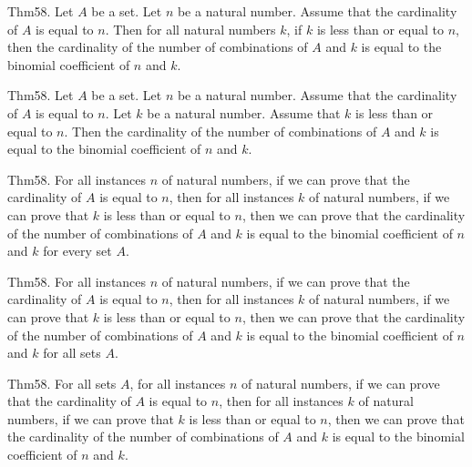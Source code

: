 \documentclass{article}
\begin{document}
Thm58. Let $A$ be a set. Let $n$ be a natural number. Assume that the cardinality of $A$ is equal to $n$. Then for all natural numbers $k$, if $k$ is less than or equal to $n$, then the cardinality of the number of combinations of $A$ and $k$ is equal to the binomial coefficient of $n$ and $k$.

Thm58. Let $A$ be a set. Let $n$ be a natural number. Assume that the cardinality of $A$ is equal to $n$. Let $k$ be a natural number. Assume that $k$ is less than or equal to $n$. Then the cardinality of the number of combinations of $A$ and $k$ is equal to the binomial coefficient of $n$ and $k$.

Thm58. For all instances $n$ of natural numbers, if we can prove that the cardinality of $A$ is equal to $n$, then for all instances $k$ of natural numbers, if we can prove that $k$ is less than or equal to $n$, then we can prove that the cardinality of the number of combinations of $A$ and $k$ is equal to the binomial coefficient of $n$ and $k$ for every set $A$.

Thm58. For all instances $n$ of natural numbers, if we can prove that the cardinality of $A$ is equal to $n$, then for all instances $k$ of natural numbers, if we can prove that $k$ is less than or equal to $n$, then we can prove that the cardinality of the number of combinations of $A$ and $k$ is equal to the binomial coefficient of $n$ and $k$ for all sets $A$.

Thm58. For all sets $A$, for all instances $n$ of natural numbers, if we can prove that the cardinality of $A$ is equal to $n$, then for all instances $k$ of natural numbers, if we can prove that $k$ is less than or equal to $n$, then we can prove that the cardinality of the number of combinations of $A$ and $k$ is equal to the binomial coefficient of $n$ and $k$.
\end{document}
